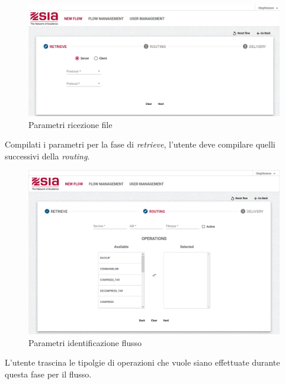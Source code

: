 \begin{figure}
\begin{center}
\includegraphics[width=1.0\columnwidth]{images/retrieve22.png}
\end{center}
\caption{Parametri ricezione file}
\label{fig:ser}
\end{figure}



\clearpage


Compilati i parametri per la fase di \textit{retrieve}, l'utente deve compilare quelli successivi della \textit{routing}.


\begin{figure}
\begin{center}
\includegraphics[width=1.0\columnwidth]{images/routing1.png}
\end{center}
\caption{Parametri identificazione flusso}
\label{fig:routing1}
\end{figure}

L'utente trascina le tipolgie di operazioni che vuole siano effettuate durante questa fase per il flusso.

